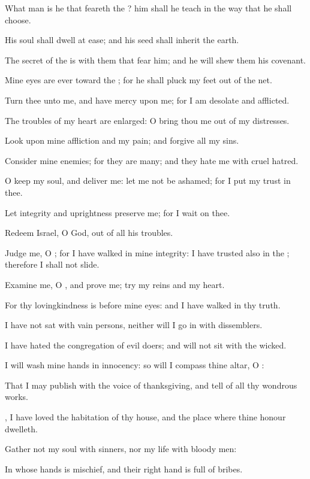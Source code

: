 \Verse What man is he that feareth the \LORD? him shall he teach in the way that he shall choose.

\Verse His soul shall dwell at ease; and his seed shall inherit the earth.

\Verse The secret of the \LORD is with them that fear him; and he will shew them his covenant.

\Verse Mine eyes are ever toward the \LORD; for he shall pluck my feet out of the net.

\Verse Turn thee unto me, and have mercy upon me; for I am desolate and afflicted.

\Verse The troubles of my heart are enlarged: O bring thou me out of my distresses.

\Verse Look upon mine affliction and my pain; and forgive all my sins.

\Verse Consider mine enemies; for they are many; and they hate me with cruel hatred.

\Verse O keep my soul, and deliver me: let me not be ashamed; for I put my trust in thee.

\Verse Let integrity and uprightness preserve me; for I wait on thee.

\Verse Redeem Israel, O God, out of all his troubles.




\Chapter
\Verse Judge me, O \LORD; for I have walked in mine integrity: I have trusted also in the \LORD; therefore I shall not slide.

\Verse Examine me, O \LORD, and prove me; try my reins and my heart.

\Verse For thy lovingkindness is before mine eyes: and I have walked in thy truth.

\Verse I have not sat with vain persons, neither will I go in with dissemblers.

\Verse I have hated the congregation of evil doers; and will not sit with the wicked.

\Verse I will wash mine hands in innocency: so will I compass thine altar, O \LORD:

\Verse That I may publish with the voice of thanksgiving, and tell of all thy wondrous works.

\Verse \LORD, I have loved the habitation of thy house, and the place where thine honour dwelleth.

\Verse Gather not my soul with sinners, nor my life with bloody men:

\Verse In whose hands is mischief, and their right hand is full of bribes.

